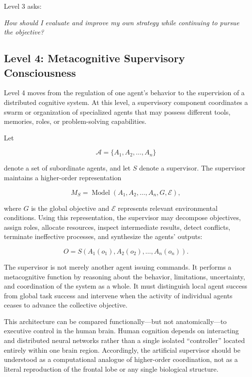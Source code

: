 Level 3 asks:

\textit{How should I evaluate and improve my own strategy while continuing to pursue the objective?}

\subsection{Level 4: Metacognitive Supervisory Consciousness}

Level 4 moves from the regulation of one agent’s behavior to the supervision of a distributed cognitive system. At this level, a supervisory component coordinates a swarm or organization of specialized agents that may possess different tools, memories, roles, or problem-solving capabilities.

Let

\begin{equation}\label{eq10}
\mathcal{A}
=
\{A_1,A_2,\ldots,A_n\}
\end{equation}

denote a set of subordinate agents, and let \(S\) denote a supervisor. The supervisor maintains a higher-order representation

\begin{equation}\label{eq11}
M_S
=
\operatorname{Model}
\left(
A_1,A_2,\ldots,A_n,G,\mathcal{E}
\right),
\end{equation}

where \(G\) is the global objective and \(\mathcal{E}\) represents relevant environmental conditions. Using this representation, the supervisor may decompose objectives, assign roles, allocate resources, inspect intermediate results, detect conflicts, terminate ineffective processes, and synthesize the agents’ outputs:

\begin{equation}\label{eq12}
O
=
S
\left(
A_1(o_1),A_2(o_2),\ldots,A_n(o_n)
\right).
\end{equation}

The supervisor is not merely another agent issuing commands. It performs a metacognitive function by reasoning about the behavior, limitations, uncertainty, and coordination of the system as a whole. It must distinguish local agent success from global task success and intervene when the activity of individual agents ceases to advance the collective objective.

This architecture can be compared functionally—but not anatomically—to executive control in the human brain. Human cognition depends on interacting and distributed neural networks rather than a single isolated “controller” located entirely within one brain region. Accordingly, the artificial supervisor should be understood as a computational analogue of higher-order coordination, not as a literal reproduction of the frontal lobe or any single biological structure.

